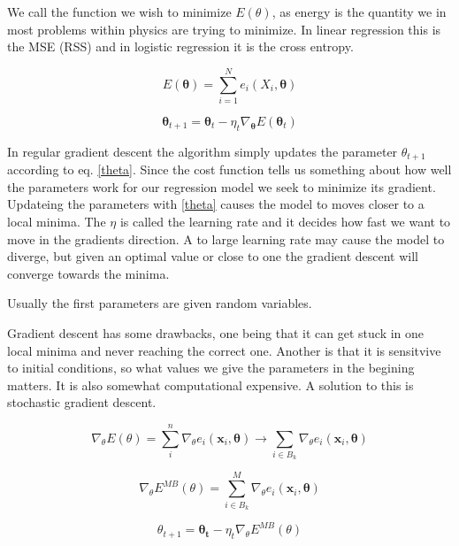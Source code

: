 \documentclass[a4paper,12pt, english]{article}
\begin{document}
We call the function we wish to minimize $E(\theta)$, as energy is the quantity we in most problems within physics are trying to minimize. In linear regression this is the MSE (RSS) and in logistic regression it is the cross entropy. 

\begin{equation}
E(\mathbf{\theta}) = \sum_{i=1}^N e_i(X_i, \mathbf{\theta}) 
\end{equation}

\begin{equation} \label{theta}
\mathbf{\theta}_{t+1} = \mathbf{\theta}_t - \eta_t \nabla_{\mathbf{\theta}} E(\mathbf{\theta}_t)
\end{equation}

In regular gradient descent the algorithm simply updates the parameter $\theta_{t+1}$ according to eq. \ref{theta}. Since the cost function tells us something about how well the parameters work for our regression model we seek to minimize its gradient. Updateing the parameters with \ref{theta} causes the model to moves closer to a local minima. The $\eta$ is called the learning rate and it decides how fast we want to move in the gradients direction. A to large learning rate may cause the model to diverge, but given an optimal value or close to one the gradient descent will converge towards the minima.  

Usually the first parameters are given random variables. 

Gradient descent has some drawbacks, one being that it can get stuck in one local minima and never reaching the correct one. Another is that it is sensitvive to initial conditions, so what values we give the parameters in the begining matters. It is also somewhat computational expensive. A solution to this is stochastic gradient descent.  

\begin{equation}
\nabla_{\theta} E(\theta) = \sum_i^n \nabla_{\theta} e_i(\mathbf{x}_i, \mathbf{\theta}) \longrightarrow \sum_{i \in B_k} \nabla_{\theta} e_i(\mathbf{x}_i, \mathbf{\theta})
\end{equation}

\begin{equation}
\nabla_{\theta} E^{MB} (\theta) = \sum_{i \in B_k}^M \nabla_{\theta} e_i(\mathbf{x}_i, \mathbf{\theta})
\end{equation}

\begin{equation} \label{theta_sgd}
\theta_{t+1} = \mathbf{\theta_t} - \eta_t \nabla_{\theta} E^{MB} (\theta)
\end{equation}
\end{document}
